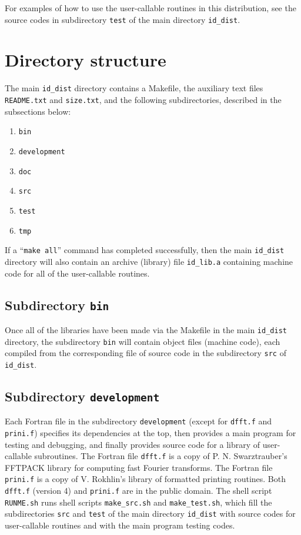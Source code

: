 \documentclass[letterpaper,12pt]{article}
\begin{document}
For examples of how to use the user-callable routines
in this distribution, see the source codes in subdirectory {\tt test}
of the main directory {\tt id\_dist}.



\section{Directory structure}

The main {\tt id\_dist} directory contains a Makefile,
the auxiliary text files {\tt README.txt} and {\tt size.txt},
and the following subdirectories, described in the subsections below:
%
\begin{enumerate}
\item {\tt bin}
\item {\tt development}
\item {\tt doc}
\item {\tt src}
\item {\tt test}
\item {\tt tmp}
\end{enumerate}
%
If a ``{\tt make all}'' command has completed successfully,
then the main {\tt id\_dist} directory will also contain
an archive (library) file {\tt id\_lib.a} containing machine code
for all of the user-callable routines.


\subsection{Subdirectory {\tt bin}}

Once all of the libraries have been made via the Makefile
in the main {\tt id\_dist} directory,
the subdirectory {\tt bin} will contain object files (machine code),
each compiled from the corresponding file of source code
in the subdirectory {\tt src} of {\tt id\_dist}.


\subsection{Subdirectory {\tt development}}

Each Fortran file in the subdirectory {\tt development}
(except for {\tt dfft.f} and {\tt prini.f})
specifies its dependencies at the top, then provides a main program
for testing and debugging, and finally provides source code
for a library of user-callable subroutines.
The Fortran file {\tt dfft.f} is a copy of P. N. Swarztrauber's FFTPACK library
for computing fast Fourier transforms.
The Fortran file {\tt prini.f} is a copy of V. Rokhlin's library
of formatted printing routines.
Both {\tt dfft.f} (version 4) and {\tt prini.f} are in the public domain.
The shell script {\tt RUNME.sh} runs shell scripts {\tt make\_src.sh}
and {\tt make\_test.sh}, which fill the subdirectories {\tt src}
and {\tt test} of the main directory {\tt id\_dist}
with source codes for user-callable routines
and with the main program testing codes.
\end{document}
